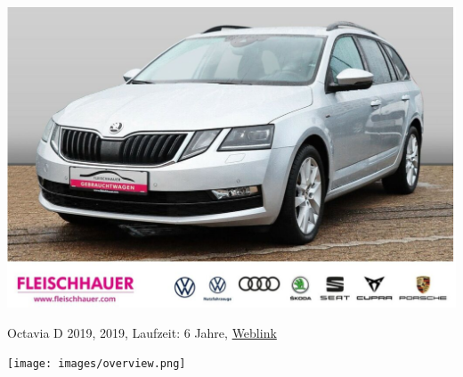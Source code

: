 \documentclass[landscape, DIV=99, 14pt]{scrartcl}
\begin{document}
\pagebreak
\null
\vspace{2cm}
\begin{center}
\includegraphics[width=0.9\columnwidth]{cars/skoda-octavia.png}

Octavia D 2019, 2019, Laufzeit: 6 Jahre, \href{https://suchen.mobile.de/fahrzeuge/details.html?id=333524150}{Weblink}
\end{center}

\pagebreak



\pagebreak

\onecolumn
\null
\vfill 
\begin{center}
\texttt{[image: images/overview.png]}
\end{center}
\vfill 
\end{document}
